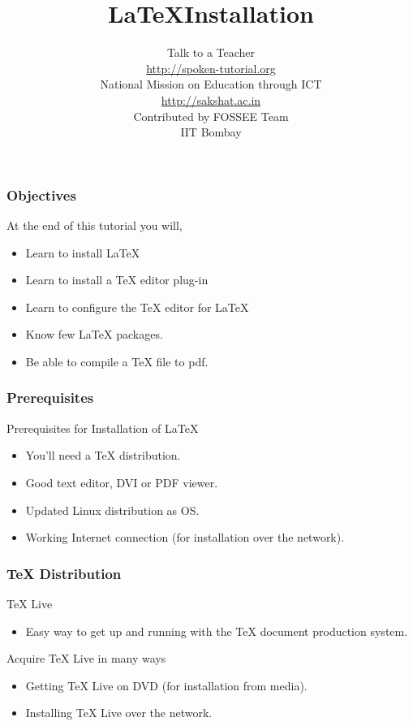 \documentclass[17pt,compress]{beamer}
\author[FOSSEE]{}
\institute[IIT Bombay]{}
\date[]{}
\begin{document}
\sffamily \bfseries
\title
[\LaTeX \: Installation]
{\LaTeX \:Installation}
\author
[FOSSEE]
{\small Talk to a Teacher\\{\color{blue}\url{http://spoken-tutorial.org}}\\\vspace{0.25cm}National Mission on Education
 through ICT\\{\color{blue}\url{ http://sakshat.ac.in}} \\ [1.65cm]
   Contributed by FOSSEE Team \\IIT Bombay  \\[0.3cm]
}

\begin{frame}
   \titlepage
\end{frame}

\begin{frame}
  \frametitle{Objectives}
  At the end of this tutorial you will,
  \begin{itemize}
  \item Learn to install LaTeX
  \item Learn to install a TeX editor plug-in
  \item Learn to configure the TeX editor for LaTeX
  \item Know few LaTeX packages.
  \item Be able to compile a TeX file to pdf.

  \end{itemize}
\end{frame}

\begin{frame}
  \frametitle{Prerequisites}
  Prerequisites for Installation of LaTeX
  \begin{itemize}
  \item You'll need a TeX distribution.
  \item Good text editor, DVI or PDF viewer.
  \item Updated Linux distribution as OS.
  \item Working Internet connection (for installation over the network).
  \end{itemize}
\end{frame}

\begin{frame}[fragile]
  \frametitle{TeX Distribution}
  TeX Live
  \begin{itemize}
  \item Easy way to get up and running with the TeX document production system.
  \end{itemize}
  Acquire TeX Live in many ways
  \begin{itemize}
  \item Getting TeX Live on DVD (for installation from media).
  \item Installing TeX Live over the network.
  \end{itemize}
\end{frame}
\end{document}
